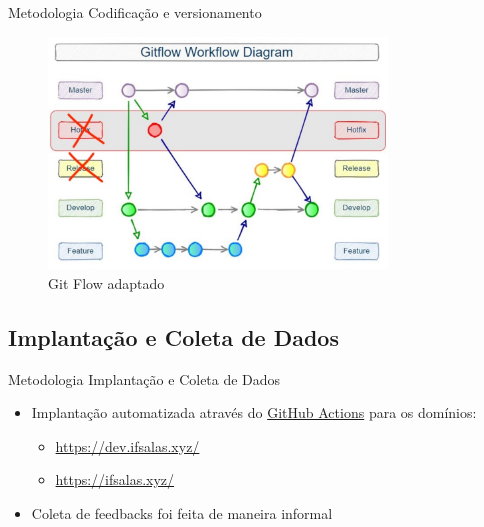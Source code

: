 \begin{frame}{Metodologia}
	{Codificação e versionamento}
	\begin{figure}
		\includegraphics[width=9cm]{images/git-flow.png}
		\caption{Git Flow adaptado}
	\end{figure}
\end{frame}


\subsection{Implantação e Coleta de Dados}
\begin{frame}{Metodologia}
	{Implantação e Coleta de Dados}
	\begin{itemize}[<+->]
		\item Implantação automatizada através do \href{https://docs.github.com/en/actions}{GitHub Actions} para os domínios:
			\begin{itemize}
				\item \href{https://dev.ifsalas.xyz/}{https://dev.ifsalas.xyz/}
				\item \href{https://ifsalas.xyz/}{https://ifsalas.xyz/}
			\end{itemize}
		\item Coleta de feedbacks foi feita de maneira informal
	\end{itemize}
\end{frame}